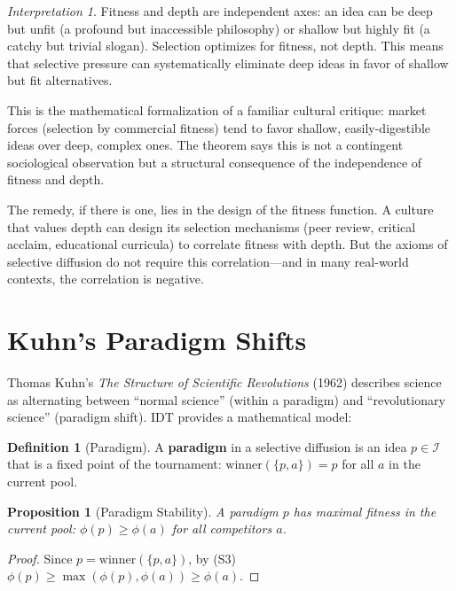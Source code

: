 \documentclass[11pt,openany]{book}
\theoremstyle{definition}
\newtheorem{definition}[axiom]{Definition}
\theoremstyle{plain}
\newtheorem{proposition}[axiom]{Proposition}
\theoremstyle{remark}
\newtheorem{interpretation}[axiom]{Interpretation}
\newcommand{\IS}{\mathcal{I}}               %
\begin{document}
\begin{interpretation}
Fitness and depth are independent axes: an idea can be deep but unfit (a profound but inaccessible philosophy) or shallow but highly fit (a catchy but trivial slogan). Selection optimizes for fitness, not depth. This means that selective pressure can systematically eliminate deep ideas in favor of shallow but fit alternatives.

This is the mathematical formalization of a familiar cultural critique: market forces (selection by commercial fitness) tend to favor shallow, easily-digestible ideas over deep, complex ones. The theorem says this is not a contingent sociological observation but a structural consequence of the independence of fitness and depth.

The remedy, if there is one, lies in the design of the fitness function. A culture that values depth can design its selection mechanisms (peer review, critical acclaim, educational curricula) to correlate fitness with depth. But the axioms of selective diffusion do not require this correlation---and in many real-world contexts, the correlation is negative.
\end{interpretation}

\section{Kuhn's Paradigm Shifts}

Thomas Kuhn's \emph{The Structure of Scientific Revolutions} (1962) describes science as alternating between ``normal science'' (within a paradigm) and ``revolutionary science'' (paradigm shift). IDT provides a mathematical model:

\begin{definition}[Paradigm]
A \textbf{paradigm} in a selective diffusion is an idea $p \in \IS$ that is a fixed point of the tournament: $\mathrm{winner}(\{p, a\}) = p$ for all $a$ in the current pool.
\end{definition}

\begin{proposition}[Paradigm Stability]
A paradigm $p$ has maximal fitness in the current pool: $\phi(p) \geq \phi(a)$ for all competitors $a$.
\end{proposition}

\begin{proof}
Since $p = \mathrm{winner}(\{p, a\})$, by (S3) $\phi(p) \geq \max(\phi(p), \phi(a)) \geq \phi(a)$.
\end{proof}
\end{document}
